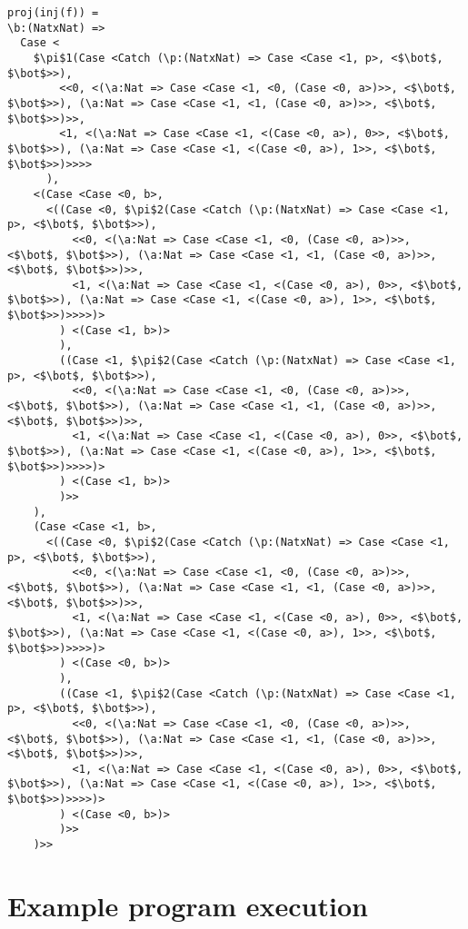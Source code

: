 \documentclass[12pt,a4paper]{report}
\theoremstyle{definition}
\theoremstyle{remark}
\begin{document}
\begin{lstlisting}[mathescape, caption={Interpreter logs from applying injection and projection terms. The upper bound on values n = 2, effectively representing the booleans.}]
proj(inj(f)) = 
\b:(NatxNat) => 
  Case <
    $\pi$1(Case <Catch (\p:(NatxNat) => Case <Case <1, p>, <$\bot$, $\bot$>>), 
        <<0, <(\a:Nat => Case <Case <1, <0, (Case <0, a>)>>, <$\bot$, $\bot$>>), (\a:Nat => Case <Case <1, <1, (Case <0, a>)>>, <$\bot$, $\bot$>>)>>,
        <1, <(\a:Nat => Case <Case <1, <(Case <0, a>), 0>>, <$\bot$, $\bot$>>), (\a:Nat => Case <Case <1, <(Case <0, a>), 1>>, <$\bot$, $\bot$>>)>>>>
      ),
    <(Case <Case <0, b>,
      <((Case <0, $\pi$2(Case <Catch (\p:(NatxNat) => Case <Case <1, p>, <$\bot$, $\bot$>>), 
          <<0, <(\a:Nat => Case <Case <1, <0, (Case <0, a>)>>, <$\bot$, $\bot$>>), (\a:Nat => Case <Case <1, <1, (Case <0, a>)>>, <$\bot$, $\bot$>>)>>, 
          <1, <(\a:Nat => Case <Case <1, <(Case <0, a>), 0>>, <$\bot$, $\bot$>>), (\a:Nat => Case <Case <1, <(Case <0, a>), 1>>, <$\bot$, $\bot$>>)>>>>)>
        ) <(Case <1, b>)>
        ), 
        ((Case <1, $\pi$2(Case <Catch (\p:(NatxNat) => Case <Case <1, p>, <$\bot$, $\bot$>>),
          <<0, <(\a:Nat => Case <Case <1, <0, (Case <0, a>)>>, <$\bot$, $\bot$>>), (\a:Nat => Case <Case <1, <1, (Case <0, a>)>>, <$\bot$, $\bot$>>)>>,
          <1, <(\a:Nat => Case <Case <1, <(Case <0, a>), 0>>, <$\bot$, $\bot$>>), (\a:Nat => Case <Case <1, <(Case <0, a>), 1>>, <$\bot$, $\bot$>>)>>>>)>
        ) <(Case <1, b>)>
        )>>
    ),
    (Case <Case <1, b>,
      <((Case <0, $\pi$2(Case <Catch (\p:(NatxNat) => Case <Case <1, p>, <$\bot$, $\bot$>>),
          <<0, <(\a:Nat => Case <Case <1, <0, (Case <0, a>)>>, <$\bot$, $\bot$>>), (\a:Nat => Case <Case <1, <1, (Case <0, a>)>>, <$\bot$, $\bot$>>)>>,
          <1, <(\a:Nat => Case <Case <1, <(Case <0, a>), 0>>, <$\bot$, $\bot$>>), (\a:Nat => Case <Case <1, <(Case <0, a>), 1>>, <$\bot$, $\bot$>>)>>>>)>
        ) <(Case <0, b>)>
        ),
        ((Case <1, $\pi$2(Case <Catch (\p:(NatxNat) => Case <Case <1, p>, <$\bot$, $\bot$>>),
          <<0, <(\a:Nat => Case <Case <1, <0, (Case <0, a>)>>, <$\bot$, $\bot$>>), (\a:Nat => Case <Case <1, <1, (Case <0, a>)>>, <$\bot$, $\bot$>>)>>,
          <1, <(\a:Nat => Case <Case <1, <(Case <0, a>), 0>>, <$\bot$, $\bot$>>), (\a:Nat => Case <Case <1, <(Case <0, a>), 1>>, <$\bot$, $\bot$>>)>>>>)>
        ) <(Case <0, b>)>
        )>>
    )>>

\end{lstlisting}

\chapter{Example program execution}\label{appendix: term evaluations}
\end{document}
